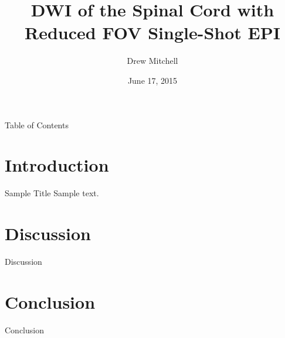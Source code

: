 \documentclass{beamer}
\title[Spinal Cord DWI with ss-EPI]{DWI of the Spinal Cord with Reduced FOV Single-Shot EPI}
\author{Drew Mitchell}
\institute{MD Anderson Cancer Center}
\date{June 17, 2015}
\begin{document}
 
{
\frame{\titlepage}
\begin{frame}{Table of Contents}
\tableofcontents
\end{frame}
}

\section{Introduction}

\begin{frame}{Sample Title}
Sample text.
\end{frame}

\section{Discussion}

\begin{frame}{Discussion}

\end{frame}

\section{Conclusion}

\begin{frame}{Conclusion}

\end{frame}
\end{document}
